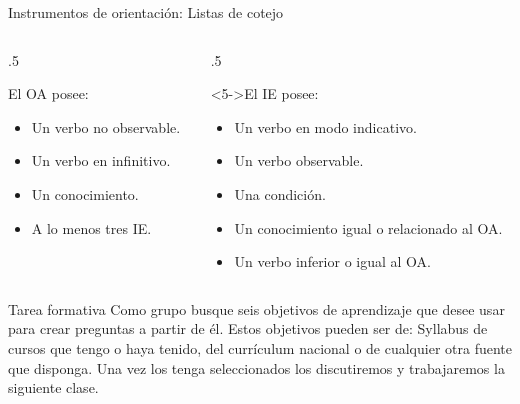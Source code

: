 \documentclass[11pt, aspectratio=169, xcolor=table,hyphens]{beamer}
\begin{document}
\begin{frame}{Instrumentos de orientación: Listas de cotejo}
	\begin{columns}
		\begin{column}{.5\linewidth}
			\begin{block}{El OA posee:}
				\begin{itemize}[<+->]
					\item[\Square] Un verbo no observable.
					\item[\Square] Un verbo en infinitivo.
					\item[\Square] Un conocimiento.
					\item[\Square] A lo menos tres IE.
				\end{itemize}
			\end{block}
		\end{column}
		\begin{column}{.5\linewidth}
			\begin{block}<5->{El IE posee:}
				\begin{itemize}
					\item[\Square]<6-> Un verbo en modo indicativo.
					\item[\Square]<7-> Un verbo observable.
					\item[\Square]<8-> Una condición.
					\item[\Square]<9-> Un conocimiento igual o relacionado al OA.
					\item[\Square]<10-> Un verbo inferior o igual al OA.
				\end{itemize}
			\end{block}
		\end{column}
	\end{columns}
\end{frame}

\begin{frame}{Tarea formativa}
	\justifying
	Como grupo busque seis objetivos de aprendizaje que desee usar para crear preguntas a partir de él. Estos objetivos pueden ser de: Syllabus de cursos que tengo o haya tenido, del currículum nacional o de cualquier otra fuente que disponga. Una vez los tenga seleccionados los discutiremos y trabajaremos la siguiente clase.
\end{frame}
\end{document}

